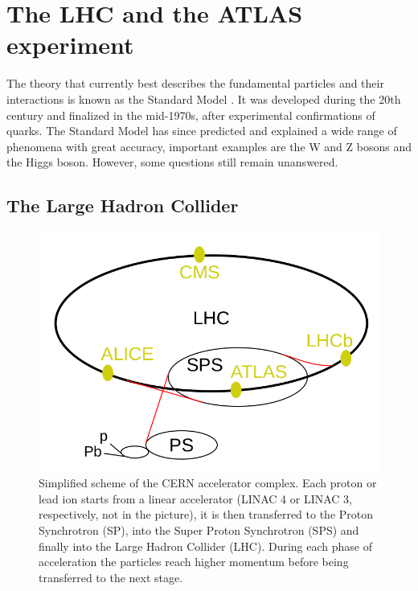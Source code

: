 
\chapter{The LHC and the ATLAS experiment}\label{chap:LHC_ATLAS}

The theory that currently best describes the fundamental particles and their interactions is known as the Standard Model \cite{Herrero1999}. It was developed during the 20th century and finalized in the mid-1970s, after experimental confirmations of quarks. The Standard Model has since predicted and explained a wide range of phenomena with great accuracy, important examples are the W and Z bosons and the Higgs boson. However, some questions still remain unanswered.


\section{The Large Hadron Collider}
\begin{figure}[h!tbp]
    \centering
    \includegraphics[width=.7\linewidth]{Images/intro/LHC.png}
    \captionsetup{width=\captionwidth}
    \caption{Simplified scheme of the CERN accelerator complex. Each proton or lead ion starts from a linear accelerator (LINAC 4 or LINAC 3, respectively, not in the picture), it is then transferred to the Proton Synchrotron (SP), into the Super Proton Synchrotron (SPS) and finally into the Large Hadron Collider (LHC). During each phase of acceleration the particles reach higher momentum before being transferred to the next stage.}
    \label{fig:LHC}
\end{figure}



